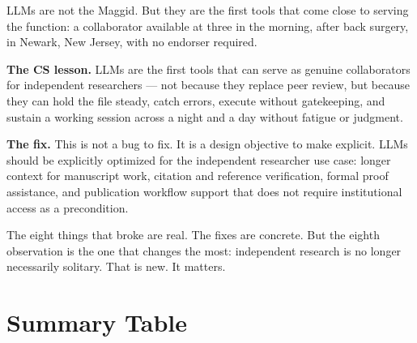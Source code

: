 LLMs are not the Maggid. But they are the first tools that
come close to serving the function: a collaborator available
at three in the morning, after back surgery, in Newark,
New Jersey, with no endorser required.

\textbf{The CS lesson.} LLMs are the first tools that can serve
as genuine collaborators for independent researchers --- not
because they replace peer review, but because they can hold the
file steady, catch errors, execute without gatekeeping, and
sustain a working session across a night and a day without
fatigue or judgment.

\textbf{The fix.} This is not a bug to fix. It is a design
objective to make explicit. LLMs should be explicitly optimized
for the independent researcher use case: longer context for
manuscript work, citation and reference verification, formal
proof assistance, and publication workflow support that does
not require institutional access as a precondition.

The eight things that broke are real. The fixes are concrete.
But the eighth observation is the one that changes the most:
independent research is no longer necessarily solitary.
That is new. It matters.

\section{Summary Table}
\label{sec:summary}

